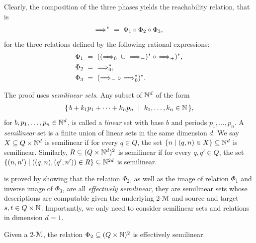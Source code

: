 \noindent
Clearly, the composition of the three phases yields
the reachability relation, that is
\begin{align} \label{eq:reachrel}
{\Longrightarrow^*} \ = \ \Phi_1 \circ \Phi_2 \circ \Phi_3,
\end{align}
for  the three relations defined by the following rational expressions:
\begin{align}
  \begin{aligned} \label{eq:regexp}
      &\Phi_1 \ = \ (({\Longrightarrow_{0}} \ \cup \ {\Longrightarrow_{-}})^\ast \circ\, {\Longrightarrow_{+}})^\ast,\\
      &\Phi_2 \ = \ {\Longrightarrow_{0}^\ast},\\
      &\Phi_3 \ = \ ({\Longrightarrow_{-}} \circ\, {\Longrightarrow_{0}^\ast})^\ast.
  \end{aligned}
\end{align}





The proof uses \emph{semilinear sets}.
Any subset of $\mathbb{N}^d$ of the form
\begin{align} \label{eq:linset}
\{\,b + k_1 p_1 + \cdots + k_n p_n \ \mid \ k_1, \dots, k_n \in \mathbb{N}\,\},
\end{align}
for $b, p_1, \dots, p_n \in \mathbb{N}^d$,
is called a
\emph{linear} set with base $b$ and periods $p_1, \dots, p_n$.
A \emph{semilinear} set is a finite union of linear sets in the same
dimension $d$.
We say $X \subseteq Q \times \mathbb{N}^d$ is semilinear 
if for every $q \in Q$, 
the set 
\(\{n \mid (q,n)\in X\} \subseteq \mathbb{N}^d\)
is semilinear.
Similarly, 
$R \subseteq (Q\times \mathbb{N}^d)^2$ is semilinear if for every $q,q' \in Q$,
the set
\( \{(n,n') \mid ((q,n),(q',n')) \in R \} \subseteq \mathbb{N}^{2d}\)
is semilinear.

 is proved by showing that the relation $\Phi_2$, 
as well as
the image of relation $\Phi_1$ and inverse image of $\Phi_3$,
are all
\emph{effectively semilinear}, \ie they are 
semilinear sets whose descriptions are computable
given the underlying 2-\cm $\mathcal{M}$ and source and target
$s, t\in Q\times\mathbb{N}$.
Importantly, we only need to consider semilinear sets and relations
in dimension $d=1$.


\begin{lemma} \label{lem:0star}
Given a 2-\cm $\mathcal{M}$, the relation
$\Phi_2 \subseteq (Q \times \mathbb{N})^2$ 
is effectively semilinear.
\end{lemma}


